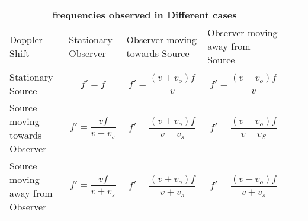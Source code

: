 \setlength{\arrayrulewidth}{0.5mm}
\setlength{\tabcolsep}{18pt}
\renewcommand{\arraystretch}{1.5}


\begin{tabular}{ |p{2cm}|p{2cm}|p{2cm}|p{3cm}|p{}p{}}
    \hline
    \multicolumn{4}{|c|}{frequencies observed in Different cases} \\
    \hline
    Doppler Shift &Stationary Observer &Observer moving towards Source &Observer moving away from Source\\
    \hline
    Stationary Source & $$f' = f$$& $$f' = \frac{(v+v_o) f}{v}$$&$$f' = \frac{(v-v_o) f}{v}$$\\
    \hline
    Source moving towards Observer &$$f' = \frac{v f}{v-v_s }$$&$$f' = \frac{(v+v_o) f}{v- v_s }$$&$$f' = \frac{(v-v_o) f}{v- v_S }$$\\
    \hline
    Source moving away from Observer&$$f' = \frac{v f}{v+ v_s }$$&$$f' = \frac{(v+v_o) f}{v+ v_s }$$&$$f' = \frac{(v-v_o) f}{v+ v_s }$$\\
    \hline
    \end{tabular}
